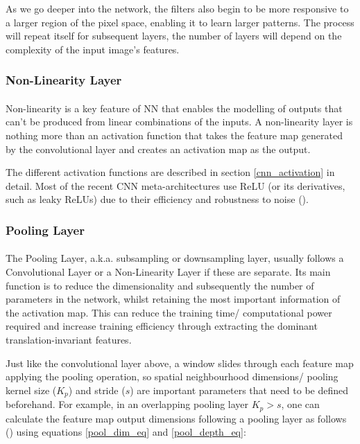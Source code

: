 As we go deeper into the network, the filters also begin to be more responsive to a larger region of the pixel space, enabling it to learn larger patterns. The process will repeat itself for subsequent layers, the number of layers will depend on the complexity of the input image's features.

\subsubsection{Non-Linearity Layer}
\paragraph{}
Non-linearity is a key feature of \gls{NN} that enables the modelling of outputs that can't be produced from linear combinations of the inputs.
A non-linearity layer is nothing more than an activation function that takes the feature map generated by the convolutional layer and creates an activation map as the output. 

The different activation functions are described in section \ref{cnn_activation} in detail. Most of the recent \gls{CNN} meta-architectures use \gls{ReLU} (or its derivatives, such as leaky \gls{ReLU}s) due to their efficiency and robustness to noise (\cite{he2015delving}).

\subsubsection{Pooling Layer}
\paragraph{}
The Pooling Layer, \gls{a.k.a.} subsampling or downsampling layer, usually follows a Convolutional Layer or a Non-Linearity Layer if these are separate. 
Its main function is to reduce the dimensionality and subsequently the number of parameters in the network, whilst retaining the most important information of the activation map. This can reduce the training time/ computational power required and increase training efficiency through extracting the dominant translation-invariant features.


Just like the convolutional layer above, a window slides through each feature map applying the pooling operation, so spatial neighbourhood dimensions/ pooling kernel size ($K_p$) and stride ($s$) are important parameters that need to be defined beforehand. For example, in an overlapping pooling layer $K_p > s$, one can calculate the feature map output dimensions following a pooling layer as follows (\cite{dumoulin2018guide}) using equations \ref{pool_dim_eq} and \ref{pool_depth_eq}:


